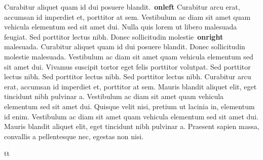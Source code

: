 \documentclass{article}
\begin{document}
Curabitur aliquet quam id dui posuere blandit.\hidenumberingonleftpage\ \textbf{onleft} Curabitur arcu erat, accumsan id imperdiet et, porttitor at sem. Vestibulum ac diam sit amet quam vehicula elementum sed sit amet dui. Nulla quis lorem ut libero malesuada feugiat. Sed porttitor lectus nibh. Donec sollicitudin molestie\hidenumberingonrightpage\ \textbf{onright} malesuada. Curabitur aliquet quam id dui posuere blandit. Donec sollicitudin molestie malesuada. Vestibulum ac diam sit amet quam vehicula elementum sed sit amet dui. Vivamus suscipit tortor eget felis porttitor volutpat. Sed porttitor lectus nibh. Sed porttitor lectus nibh. Sed porttitor lectus nibh. Curabitur arcu erat, accumsan id imperdiet et, porttitor at sem. Mauris blandit aliquet elit, eget tincidunt nibh pulvinar a. Vestibulum ac diam sit amet quam vehicula elementum sed sit amet dui. Quisque velit nisi, pretium ut lacinia in, elementum id enim. Vestibulum ac diam sit amet quam vehicula elementum sed sit amet dui. Mauris blandit aliquet elit, eget tincidunt nibh pulvinar a. Praesent sapien massa, convallis a pellentesque nec, egestas non nisi.

\endnumbering
\newpage
tt
\end{document}
